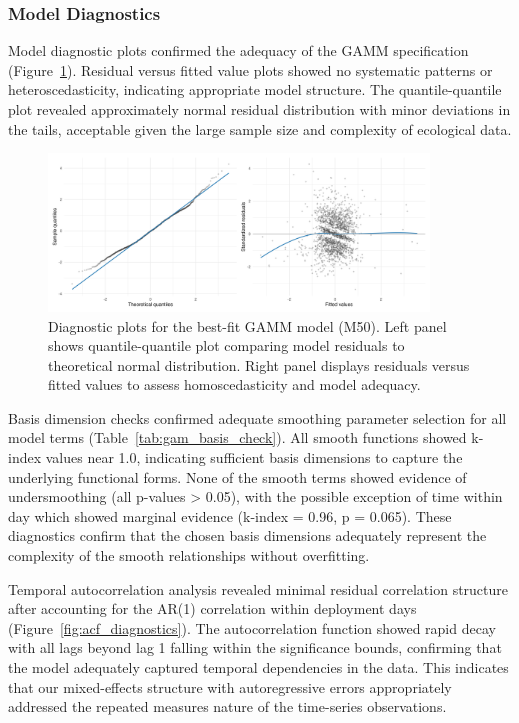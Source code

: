\subsubsection{Model Diagnostics}

Model diagnostic plots confirmed the adequacy of the GAMM specification (Figure~\ref{fig:model_diagnostics_30min}). Residual versus fitted value plots showed no systematic patterns or heteroscedasticity, indicating appropriate model structure. The quantile-quantile plot revealed approximately normal residual distribution with minor deviations in the tails, acceptable given the large sample size and complexity of ecological data.

\begin{figure}[htbp]
    \centering
    \includegraphics[width=0.9\textwidth]{supplemental/results/30_min/figures/diag_qq_and_residuals_1x2.png}
    \caption{Diagnostic plots for the best-fit GAMM model (M50). Left panel shows quantile-quantile plot comparing model residuals to theoretical normal distribution. Right panel displays residuals versus fitted values to assess homoscedasticity and model adequacy.}
    \label{fig:model_diagnostics_30min}
\end{figure}

Basis dimension checks confirmed adequate smoothing parameter selection for all model terms (Table~\ref{tab:gam_basis_check}). All smooth functions showed k-index values near 1.0, indicating sufficient basis dimensions to capture the underlying functional forms. None of the smooth terms showed evidence of undersmoothing (all p-values > 0.05), with the possible exception of time within day which showed marginal evidence (k-index = 0.96, p = 0.065). These diagnostics confirm that the chosen basis dimensions adequately represent the complexity of the smooth relationships without overfitting.



Temporal autocorrelation analysis revealed minimal residual correlation structure after accounting for the AR(1) correlation within deployment days (Figure~\ref{fig:acf_diagnostics}). The autocorrelation function showed rapid decay with all lags beyond lag 1 falling within the significance bounds, confirming that the model adequately captured temporal dependencies in the data. This indicates that our mixed-effects structure with autoregressive errors appropriately addressed the repeated measures nature of the time-series observations.


